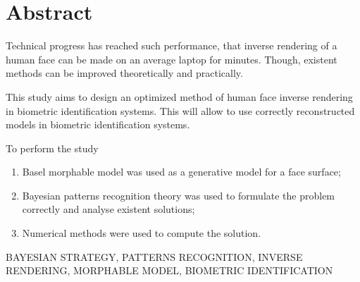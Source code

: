 \chapter*{Abstract}

Technical progress has reached such performance,
that inverse rendering of a human face can be made on an average laptop
for minutes.
Though,
existent methods can be improved theoretically and practically.

This study aims to design an optimized method
of human face inverse rendering in biometric identification systems.
This will allow to use correctly reconstructed models
in biometric identification systems.

To perform the study
\begin{enumerate}
  \item
    Basel morphable model was used as a generative model for a face surface;
  \item
    Bayesian patterns recognition theory was used
    to formulate the problem correctly and analyse existent solutions;
  \item
    Numerical methods were used to compute the solution.
\end{enumerate}

\MakeUppercase{bayesian strategy, patterns recognition,
 inverse rendering, morphable model,
biometric identification}
